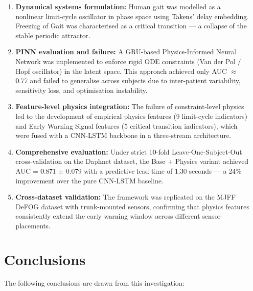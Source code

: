 \documentclass[12pt,a4paper,oneside]{report}
\numberwithin{equation}{chapter}
\numberwithin{figure}{chapter}
\numberwithin{table}{chapter}
\begin{document}
\begin{enumerate}[leftmargin=*, itemsep=4pt]
  \item \textbf{Dynamical systems formulation:} Human gait was modelled as a nonlinear limit-cycle oscillator in phase space using Takens' delay embedding. Freezing of Gait was characterised as a critical transition --- a collapse of the stable periodic attractor.

  \item \textbf{PINN evaluation and failure:} A GRU-based Physics-Informed Neural Network was implemented to enforce rigid ODE constraints (Van der Pol / Hopf oscillator) in the latent space. This approach achieved only AUC $\approx$ 0.77 and failed to generalise across subjects due to inter-patient variability, sensitivity loss, and optimisation instability.

  \item \textbf{Feature-level physics integration:} The failure of constraint-level physics led to the development of empirical physics features (9 limit-cycle indicators) and Early Warning Signal features (5 critical transition indicators), which were fused with a CNN-LSTM backbone in a three-stream architecture.

  \item \textbf{Comprehensive evaluation:} Under strict 10-fold Leave-One-Subject-Out cross-validation on the Daphnet dataset, the Base + Physics variant achieved AUC = 0.871 $\pm$ 0.079 with a predictive lead time of 1.30 seconds --- a 24\% improvement over the pure CNN-LSTM baseline.

  \item \textbf{Cross-dataset validation:} The framework was replicated on the MJFF DeFOG dataset with trunk-mounted sensors, confirming that physics features consistently extend the early warning window across different sensor placements.
\end{enumerate}

\section{Conclusions}

The following conclusions are drawn from this investigation:
\end{document}
